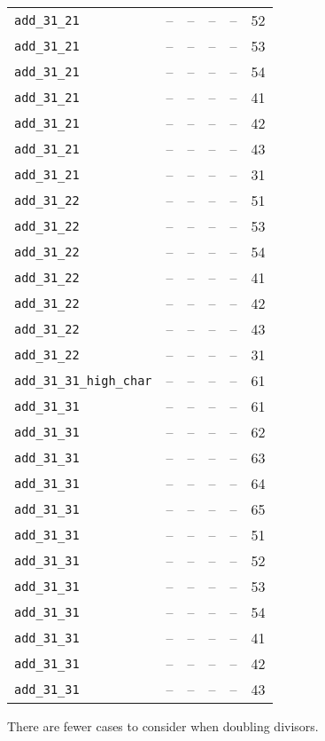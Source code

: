 \begin{longtable}{|l|rrrr|c|}
  {\tt add\_31\_21}  & -- & -- & -- & -- & 52 \\
  {\tt add\_31\_21}  & -- & -- & -- & -- & 53 \\
  {\tt add\_31\_21}  & -- & -- & -- & -- & 54 \\
  {\tt add\_31\_21}  & -- & -- & -- & -- & 41 \\
  {\tt add\_31\_21}  & -- & -- & -- & -- & 42 \\
  {\tt add\_31\_21}  & -- & -- & -- & -- & 43 \\
  {\tt add\_31\_21}  & -- & -- & -- & -- & 31 \\
  \hline
  {\tt add\_31\_22}  & -- & -- & -- & -- & 51 \\
  {\tt add\_31\_22}  & -- & -- & -- & -- & 53 \\
  {\tt add\_31\_22}  & -- & -- & -- & -- & 54 \\
  {\tt add\_31\_22}  & -- & -- & -- & -- & 41 \\
  {\tt add\_31\_22}  & -- & -- & -- & -- & 42 \\
  {\tt add\_31\_22}  & -- & -- & -- & -- & 43 \\
  {\tt add\_31\_22}  & -- & -- & -- & -- & 31 \\
  \hline
  {\tt add\_31\_31\_high\_char}  & -- & -- & -- & -- & 61 \\
  {\tt add\_31\_31}  & -- & -- & -- & -- & 61 \\
  {\tt add\_31\_31}  & -- & -- & -- & -- & 62 \\
  {\tt add\_31\_31}  & -- & -- & -- & -- & 63 \\
  {\tt add\_31\_31}  & -- & -- & -- & -- & 64 \\
  {\tt add\_31\_31}  & -- & -- & -- & -- & 65 \\
  {\tt add\_31\_31}  & -- & -- & -- & -- & 51 \\
  {\tt add\_31\_31}  & -- & -- & -- & -- & 52 \\
  {\tt add\_31\_31}  & -- & -- & -- & -- & 53 \\
  {\tt add\_31\_31}  & -- & -- & -- & -- & 54 \\
  {\tt add\_31\_31}  & -- & -- & -- & -- & 41 \\
  {\tt add\_31\_31}  & -- & -- & -- & -- & 42 \\
  {\tt add\_31\_31}  & -- & -- & -- & -- & 43 \\
  \hline
\end{longtable}

There are fewer cases to consider when doubling divisors.

